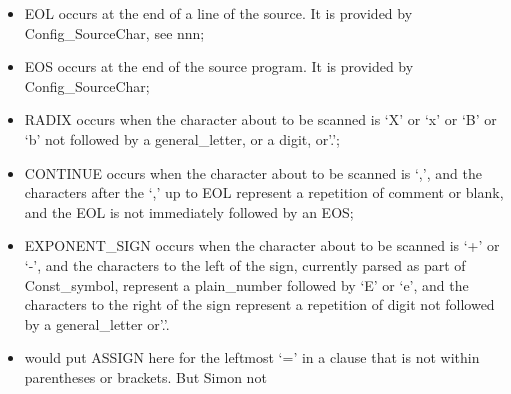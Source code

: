 \begin{itemize}
\item
  EOL occurs at the end of a line of the source. It is provided by
  Config\_SourceChar, see nnn;
\item
  EOS occurs at the end of the source program. It is provided by
  Config\_SourceChar;
\item
  RADIX occurs when the character about to be scanned is `X' or `x' or
  `B' or `b' not followed by a general\_letter, or a digit, or'.';
\item
  CONTINUE occurs when the character about to be scanned is `,', and the
  characters after the `,' up to EOL represent a repetition of comment
  or blank, and the EOL is not immediately followed by an EOS;
\item
  EXPONENT\_SIGN occurs when the character about to be scanned is `+' or
  `-', and the characters to the left of the sign, currently parsed as
  part of Const\_symbol, represent a plain\_number followed by `E' or
  `e', and the characters to the right of the sign represent a
  repetition of digit not followed by a general\_letter or'.'.
\item
  would put ASSIGN here for the leftmost `=' in a clause that is not
  within parentheses or brackets. But Simon not


\end{itemize}

